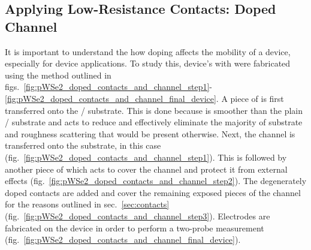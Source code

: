 \subsection{Applying Low-Resistance Contacts: Doped Channel}\label{subsec:mufe_doped_channel}
It is important to understand the how doping affects the mobility of a device, especially for device applications. To study this, device's with were fabricated using the method outlined in figs.~\ref{fig:pWSe2_doped_contacts_and_channel_step1}-\ref{fig:pWSe2_doped_contacts_and_channel_final_device}. A piece of \hbn is first transferred onto the / substrate. This is done because \hbn is smoother than the plain / substrate and acts to reduce and effectively eliminate the majority of substrate and roughness scattering that would be present otherwise. Next, the channel is transferred onto the \hbn substrate, in this case \lightlyone (fig.~\ref{fig:pWSe2_doped_contacts_and_channel_step1}). This is followed by another piece of \hbn which acts to cover the channel and protect it from external effects (fig.~\ref{fig:pWSe2_doped_contacts_and_channel_step2}). The degenerately doped contacts are added and cover the remaining exposed pieces of the channel for the reasons outlined in sec.~\ref{sec:contacts} (fig.~\ref{fig:pWSe2_doped_contacts_and_channel_step3}). Electrodes are fabricated on the device in order to perform a two-probe measurement (fig.~\ref{fig:pWSe2_doped_contacts_and_channel_final_device}). 
